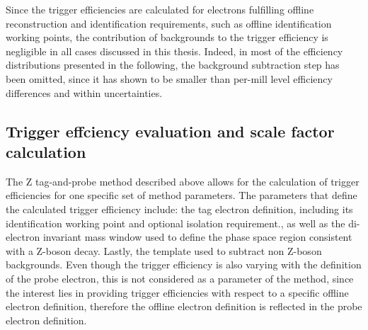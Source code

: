 Since the trigger efficiencies are calculated for electrons fulfilling offline reconstruction and identification requirements,  such as offline identification working points, the contribution of backgrounds to the trigger efficiency is negligible in all cases discussed in this thesis.  Indeed, in most of the efficiency distributions presented in the following,  the background subtraction step has been omitted, since it has shown to be smaller than per-mill level efficiency differences and within uncertainties.

\subsection{Trigger effciency evaluation and scale factor calculation}
The Z tag-and-probe method described above allows for the calculation of trigger efficiencies for one specific set of method parameters.  The parameters that define the calculated trigger efficiency include: the tag electron definition,  including its identification working point and optional isolation requirement., as well as the di-electron invariant mass window used to define the phase space region consistent with a Z-boson decay.  Lastly,  the template used to subtract non Z-boson backgrounds.  Even though the trigger efficiency is also varying with the definition of the probe electron,  this is not considered as a parameter of the method,  since the interest lies in providing trigger efficiencies with respect to a specific offline electron definition,  therefore the offline electron definition is reflected in the probe electron definition. 

